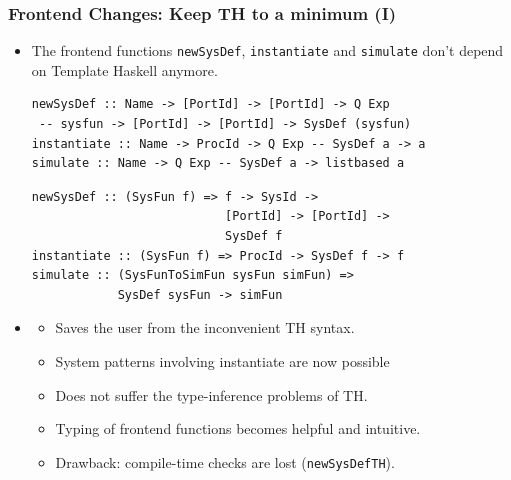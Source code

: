 \documentclass{beamer}
\begin{document}
\begin{frame}[fragile]
  \frametitle{Frontend Changes: Keep TH to a minimum (I)}
  \begin{itemize}
  \item<1-> The frontend functions \texttt{newSysDef},
    \texttt{instantiate} and \texttt{simulate} don't depend on
    Template Haskell anymore.

\begin{lstlisting}
newSysDef :: Name -> [PortId] -> [PortId] -> Q Exp
 -- sysfun -> [PortId] -> [PortId] -> SysDef (sysfun)
instantiate :: Name -> ProcId -> Q Exp -- SysDef a -> a
simulate :: Name -> Q Exp -- SysDef a -> listbased a 
\end{lstlisting}
\begin{lstlisting}
newSysDef :: (SysFun f) => f -> SysId -> 
                           [PortId] -> [PortId] ->
                           SysDef f
instantiate :: (SysFun f) => ProcId -> SysDef f -> f
simulate :: (SysFunToSimFun sysFun simFun) => 
            SysDef sysFun -> simFun
\end{lstlisting}

\item<2->     
  \begin{itemize}
  \item Saves the user from the inconvenient TH syntax.
  \item System patterns involving instantiate are now possible
  \item Does not suffer the type-inference problems of TH.
  \item Typing of frontend functions becomes helpful and intuitive.
  \item \alert{Drawback}: compile-time checks are lost (\texttt{newSysDefTH}).
  \end{itemize}
\end{itemize}
\end{frame}
\end{document}
